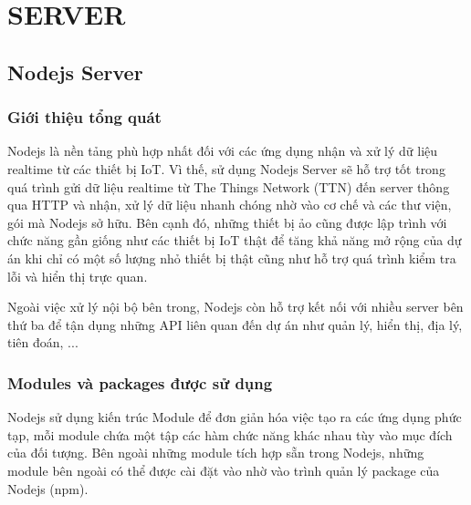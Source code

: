 


\chapter{SERVER}


\section{Nodejs Server}
\subsection{Giới thiệu tổng quát}
Nodejs là nền tảng phù hợp nhất đối với các ứng dụng nhận và xử lý dữ liệu realtime từ các thiết bị IoT. Vì thế, sử dụng Nodejs Server sẽ hỗ trợ tốt trong quá trình gửi dữ liệu realtime từ The Things Network (TTN) đến server thông qua HTTP và nhận, xử lý dữ liệu nhanh chóng nhờ vào cơ chế và các thư viện, gói mà Nodejs sở hữu. Bên cạnh đó, những thiết bị ảo cũng được lập trình với chức năng gần giống như các thiết bị IoT thật để tăng khả năng mở rộng của dự án khi chỉ có một số lượng nhỏ thiết bị thật cũng như hỗ trợ quá trình kiểm tra lỗi và hiển thị trực quan.

Ngoài việc xử lý nội bộ bên trong, Nodejs còn hỗ trợ kết nối với nhiều server bên thứ ba để tận dụng những API liên quan đến dự án như quản lý, hiển thị, địa lý, tiên đoán, ...

\subsection{Modules và packages được sử dụng}
Nodejs sử dụng kiến trúc Module để đơn giản hóa việc tạo ra các ứng dụng phức tạp, mỗi module chứa một tập các hàm chức năng khác nhau tùy vào mục đích của đối tượng. Bên ngoài những module tích hợp sẵn trong Nodejs, những module bên ngoài có thể được cài đặt vào nhờ vào trình quản lý package của Nodejs (npm). 

